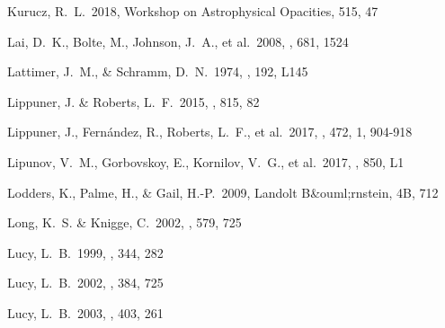 \documentclass[twocolumn, twocolappendix]{aastex63}
\begin{document}
\begin{thebibliography}{}


 Kurucz, R.~L.\ 2018, Workshop on Astrophysical Opacities, 515, 47





 Lai, D.~K., Bolte, M., Johnson, J.~A., et al.\ 2008, \apj, 681, 1524


 Lattimer, J.~M., \& Schramm, D.~N.\ 1974, \apjl, 192, L145




 Lippuner, J. \& Roberts, L.~F.\ 2015, \apj, 815, 82


 Lippuner, J., Fern\'{a}ndez, R., Roberts, L.~F., et al.\ 2017, \mnras, 472, 1, 904-918


 Lipunov, V.~M., Gorbovskoy, E., Kornilov, V.~G., et al.\ 2017, \apjl, 850, L1


 Lodders, K., Palme, H., \& Gail, H.-P.\ 2009, Landolt B\&ouml;rnstein, 4B, 712

 Long, K.~S. \& Knigge, C.\ 2002, \apj, 579, 725




 Lucy, L.~B.\ 1999, \aap, 344, 282




 Lucy, L.~B.\ 2002, \aap, 384, 725


 Lucy, L.~B.\ 2003, \aap, 403, 261



\end{thebibliography}
\end{document}

